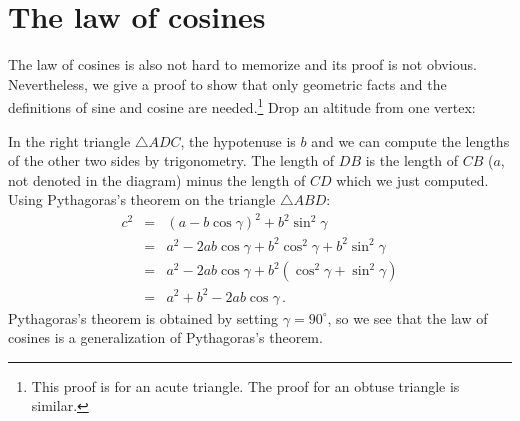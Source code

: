 \documentclass[11pt,a4paper]{article}
\begin{document}

\section{The law of cosines}

The law of cosines is also not hard to memorize and its proof is not obvious. Nevertheless, we give a proof to show that only geometric facts and the definitions of sine and cosine are needed.\footnote{This proof is for an acute triangle. The proof for an obtuse triangle is similar.} Drop an altitude from one vertex:
\begin{center}
\end{center}
In the right triangle $\triangle ADC$, the hypotenuse is $b$ and we can compute the lengths of the other two sides by trigonometry. The length of $DB$ is the length of $CB$ ($a$, not denoted in the diagram) minus the length of $CD$ which we just computed. Using Pythagoras's theorem on the triangle $\triangle ABD$:
\begin{eqnarray*}
c^2 &=& (a-b\cos\gamma)^2 + b^2\sin^2\gamma\\
&=& a^2-2ab\cos\gamma + b^2\cos^2\gamma + b^2\sin^2\gamma\\
&=& a^2-2ab\cos\gamma + b^2(\cos^2\gamma + \sin^2\gamma)\\
&=& a^2+b^2-2ab\cos\gamma\,.
\end{eqnarray*}
Pythagoras's theorem is obtained by setting $\gamma=90^\circ$, so we see that the law of cosines is a generalization of Pythagoras's theorem.


\newpage
\end{document}
